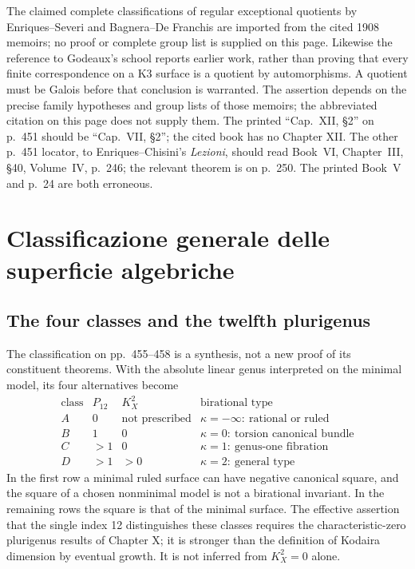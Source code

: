 The claimed complete classifications of regular exceptional quotients by Enriques--Severi and Bagnera--De Franchis are imported from the cited 1908 memoirs; no proof or complete group list is supplied on this page. Likewise the reference to Godeaux's school reports earlier work, rather than proving that every finite correspondence on a K3 surface is a quotient by automorphisms. A quotient must be Galois before that conclusion is warranted. The assertion depends on the precise family hypotheses and group lists of those memoirs; the abbreviated citation on this page does not supply them. The printed ``Cap.~XII, \S2'' on p.~451 should be ``Cap.~VII, \S2''; the cited book has no Chapter XII. The other p.~451 locator, to Enriques--Chisini's \emph{Lezioni}, should read Book~VI, Chapter~III, \S40, Volume~IV, p.~246; the relevant theorem is on p.~250. The printed Book~V and p.~24 are both erroneous.

\section{Classificazione generale delle superficie algebriche}
\label{cp2-xi-7}

\subsection{The four classes and the twelfth plurigenus}

The classification on pp.~455--458 is a synthesis, not a new proof of its constituent theorems. With the absolute linear genus interpreted on the minimal model, its four alternatives become
\[
\begin{array}{c|c|c|l}
\text{class}&P_{12}&K_X^2&\text{birational type}\\\hline
A&0&\text{not prescribed}&\kappa=-\infty:\ \text{rational or ruled}\\
B&1&0&\kappa=0:\ \text{torsion canonical bundle}\\
C&>1&0&\kappa=1:\ \text{genus-one fibration}\\
D&>1&>0&\kappa=2:\ \text{general type}
\end{array}
\]
In the first row a minimal ruled surface can have negative canonical square, and the square of a chosen nonminimal model is not a birational invariant. In the remaining rows the square is that of the minimal surface. The effective assertion that the single index 12 distinguishes these classes requires the characteristic-zero plurigenus results of Chapter X; it is stronger than the definition of Kodaira dimension by eventual growth. It is not inferred from \(K_X^2=0\) alone.

